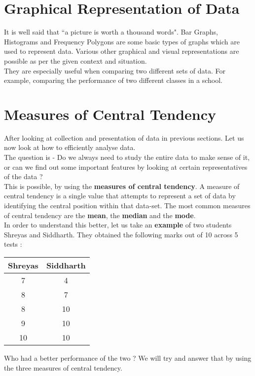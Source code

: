 \documentclass[12pt, letterpaper]{article}
\begin{document}
\section{Graphical Representation of Data}
It is well said that ``a picture is worth a thousand words". Bar Graphs, Histograms and Frequency Polygons are some basic types of graphs which are used to represent data. Various other graphical and visual representations are possible as per the given context and situation.\\
They are especially useful when comparing two different sets of data. For example, comparing the performance of two different classes in a school.

\section{Measures of Central Tendency}
After looking at collection and presentation of data in previous sections. Let us now look at how to efficiently analyse data. \\
The question is - Do we always need to study the entire data to make sense of it, or can we find out some important features by looking at certain representatives of the data ? \\
This is possible, by using the \textbf{measures of central tendency}. A measure of central tendency is a single value that attempts to represent a set of data by identifying the central position within that data-set. The most common measures of central tendency are the \textbf{mean}, the \textbf{median} and the \textbf{mode}.\\
In order to understand this better, let us take an \textbf{example} of two students Shreyas and Siddharth. They obtained the following marks out of 10 across 5 tests : 
\begin{center}
\begin{tabular}{ |c|c| } 
 \hline
 \textbf{Shreyas} & \textbf{Siddharth} \\
 \hline
 7 & 4 \\ 
 8 & 7 \\
 8 & 10 \\
 9 & 10 \\
 10 & 10 \\
 \hline
\end{tabular}
\end{center}
Who had a better performance of the two ? We will try and answer that by using the three measures of central tendency.
\end{document}
